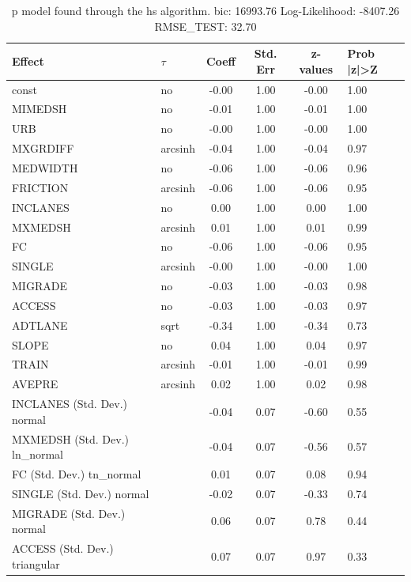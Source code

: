 \begin{table}
	\caption{p model found through the hs algorithm. bic: 16993.76 Log-Likelihood: -8407.26 RMSE_TEST: 32.70}
	\begin{center}
		\begin{tabular}{|l|l|c|c|c|l|}
			\hline
			Effect & $\tau$ & Coeff & Std. Err & z-values & Prob |z|>Z \\
			\hline
			const & no & -0.00 & 1.00 & -0.00 & 1.00 \\
			\hline
			MIMEDSH & no & -0.01 & 1.00 & -0.01 & 1.00 \\
			\hline
			URB & no & -0.00 & 1.00 & -0.00 & 1.00 \\
			\hline
			MXGRDIFF & arcsinh & -0.04 & 1.00 & -0.04 & 0.97 \\
			\hline
			MEDWIDTH & no & -0.06 & 1.00 & -0.06 & 0.96 \\
			\hline
			FRICTION & arcsinh & -0.06 & 1.00 & -0.06 & 0.95 \\
			\hline
			INCLANES & no & 0.00 & 1.00 & 0.00 & 1.00 \\
			\hline
			MXMEDSH & arcsinh & 0.01 & 1.00 & 0.01 & 0.99 \\
			\hline
			FC & no & -0.06 & 1.00 & -0.06 & 0.95 \\
			\hline
			SINGLE & arcsinh & -0.00 & 1.00 & -0.00 & 1.00 \\
			\hline
			MIGRADE & no & -0.03 & 1.00 & -0.03 & 0.98 \\
			\hline
			ACCESS & no & -0.03 & 1.00 & -0.03 & 0.97 \\
			\hline
			ADTLANE & sqrt & -0.34 & 1.00 & -0.34 & 0.73 \\
			\hline
			SLOPE & no & 0.04 & 1.00 & 0.04 & 0.97 \\
			\hline
			TRAIN & arcsinh & -0.01 & 1.00 & -0.01 & 0.99 \\
			\hline
			AVEPRE & arcsinh & 0.02 & 1.00 & 0.02 & 0.98 \\
			\hline
			INCLANES (Std. Dev.) normal &  & -0.04 & 0.07 & -0.60 & 0.55 \\
			\hline
			MXMEDSH (Std. Dev.) ln_normal &  & -0.04 & 0.07 & -0.56 & 0.57 \\
			\hline
			FC (Std. Dev.) tn_normal &  & 0.01 & 0.07 & 0.08 & 0.94 \\
			\hline
			SINGLE (Std. Dev.) normal &  & -0.02 & 0.07 & -0.33 & 0.74 \\
			\hline
			MIGRADE (Std. Dev.) normal &  & 0.06 & 0.07 & 0.78 & 0.44 \\
			\hline
			ACCESS (Std. Dev.) triangular &  & 0.07 & 0.07 & 0.97 & 0.33 \\

\end{tabular}
\end{center}
\end{table}

